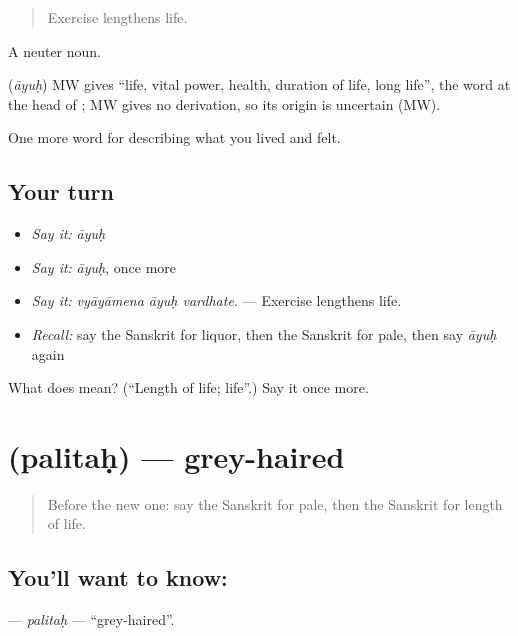 \begin{quote}
Exercise lengthens life.
\end{quote}

A neuter noun.

\begin{cousinweb}
\textbf{} (\emph{āyuḥ}) MW gives \textquotedblleft{}life, vital power, health, duration of life, long life\textquotedblright{}, the word at the head of \textbf{}; MW gives no derivation, so its origin is uncertain (MW).
\end{cousinweb}

\begin{grammarlens}[title={What you've built}]
One more word for describing what you lived and felt.
\end{grammarlens}

\subsection*{Your turn}
\begin{itemize}
\raggedright
  \item \emph{Say it:} \emph{āyuḥ}
  \item \emph{Say it:} \emph{āyuḥ}, once more
  \item \emph{Say it:} \emph{vyāyāmena āyuḥ vardhate.} — Exercise lengthens life.
  \item \emph{Recall:} say the Sanskrit for liquor, then the Sanskrit for pale, then say \emph{āyuḥ} again
\end{itemize}

\begin{tcolorbox}[breakable,colback=teal!4,colframe=teal!35!black,title={Before you move on}]
What does  mean? (\textquotedblleft{}Length of life; life\textquotedblright{}.) Say it once more.
\end{tcolorbox}
\section[\texorpdfstring{\sk{पलितः} (palitaḥ)}{पलितः (palitaḥ)}]{ (palitaḥ) — grey-haired}

\label{lesson:SA-C490-palitah}



\begin{quote}
Before the new one: say the Sanskrit for pale, then the Sanskrit for length of life.
\end{quote}

\subsection*{You'll want to know: }
\textbf{} — \emph{palitaḥ} — \textquotedblleft{}grey-haired\textquotedblright{}.


